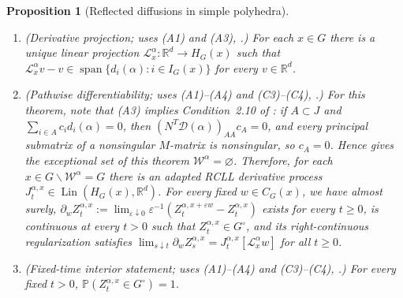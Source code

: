\documentclass[aihp]{imsart}
\numberwithin{equation}{section}
\theoremstyle{plain}
\newtheorem{proposition}[proposition]{Proposition}
\theoremstyle{definition}
\newcommand{\R}{\mathbb R}
\newcommand{\1}{\mathbf 1}
\begin{document}
\begin{proposition}[Reflected diffusions in simple polyhedra]
\begin{enumerate}[label=\textup{(C\arabic*)},leftmargin=2.1em]
\item \emph{(Derivative projection; uses \textup{(A1)} and \textup{(A3)},
\cite[Lemma~3.11]{LipshutzRamanan2019}.)}
For each $x\in G$ there is a unique linear projection
$\mathcal L_x^\alpha:\R^d\to H_G(x)$ such that
$\mathcal L_x^\alpha v-v\in
\operatorname{span}\{d_i(\alpha):i\in I_G(x)\}$ for every $v\in\R^d$.

\item \emph{(Pathwise differentiability; uses \textup{(A1)}--\textup{(A4)} and
\textup{(C3)}--\textup{(C4)}, \cite[Theorem~3.13 and Corollary~3.15]{LipshutzRamanan2019}.)}
For this theorem, note that \textup{(A3)} implies Condition~2.10 of
\cite{LipshutzRamanan2019}: if $A\subset J$ and
$\sum_{i\in A}c_i d_i(\alpha)=0$, then
$(N^T\mathcal D(\alpha))_{AA}c_A=0$, and every principal submatrix of a
nonsingular $M$-matrix is nonsingular, so $c_A=0$.  Hence
\cite[Lemma~3.9]{LipshutzRamanan2019} gives the exceptional set of this theorem $\mathcal W^\alpha=\varnothing$.  Therefore,
for each $x\in G\backslash \mathcal W^\alpha=G$ there is an adapted RCLL derivative process
$J_t^{\alpha,x}\in\operatorname{Lin}(H_G(x),\R^d)$.  For every fixed
$w\in C_G(x)$, we have almost surely,
$\partial_w Z_t^{\alpha,x}:=\lim_{\varepsilon\downarrow0}
\varepsilon^{-1}(Z_t^{\alpha,x+\varepsilon w}-Z_t^{\alpha,x})$ exists for every
$t\ge0$, is continuous at every
$t>0$ such that $Z_t^{\alpha,x}\in G^\circ$, and its right-continuous regularization satisfies
$\lim_{s\downarrow t}\partial_w Z_s^{\alpha,x}
=J_t^{\alpha,x}[\mathcal L_x^\alpha w]$ for all $t\ge0$.

\item \emph{(Fixed-time interior statement; uses \textup{(A1)}--\textup{(A4)}
and \textup{(C3)}--\textup{(C4)}, \cite[Lemma~4.13]{LipshutzRamanan2019}.)}
For every fixed $t>0$, $\mathbb P(Z_t^{\alpha,x}\in G^\circ)=1$.
\end{enumerate}
\end{proposition}
\end{document}
